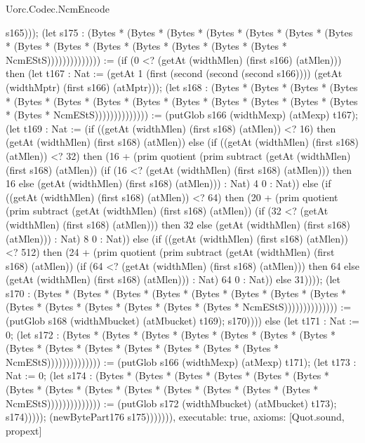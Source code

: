 \begin{lexlean}{Uorc.Codec.NcmEncode}
\begin{semanticmodule}
{s165))); (let s175 : (Bytes * (Bytes * (Bytes * (Bytes * (Bytes * (Bytes * (Bytes * (Bytes * (Bytes * (Bytes * (Bytes * (Bytes * (Bytes * (Bytes * NcmEStS)))))))))))))) := (if (0 <? (getAt (widthMlen) (first s166) (atMlen))) then (let t167 : Nat := (getAt 1 (first (second (second (second s166)))) (getAt (widthMptr) (first s166) (atMptr))); (let s168 : (Bytes * (Bytes * (Bytes * (Bytes * (Bytes * (Bytes * (Bytes * (Bytes * (Bytes * (Bytes * (Bytes * (Bytes * (Bytes * (Bytes * NcmEStS)))))))))))))) := (putGlob s166 (widthMexp) (atMexp) t167); (let t169 : Nat := (if ((getAt (widthMlen) (first s168) (atMlen)) <? 16) then (getAt (widthMlen) (first s168) (atMlen)) else (if ((getAt (widthMlen) (first s168) (atMlen)) <? 32) then (16 + (prim quotient (prim subtract (getAt (widthMlen) (first s168) (atMlen)) (if (16 <? (getAt (widthMlen) (first s168) (atMlen))) then 16 else (getAt (widthMlen) (first s168) (atMlen))) : Nat) 4 0 : Nat)) else (if ((getAt (widthMlen) (first s168) (atMlen)) <? 64) then (20 + (prim quotient (prim subtract (getAt (widthMlen) (first s168) (atMlen)) (if (32 <? (getAt (widthMlen) (first s168) (atMlen))) then 32 else (getAt (widthMlen) (first s168) (atMlen))) : Nat) 8 0 : Nat)) else (if ((getAt (widthMlen) (first s168) (atMlen)) <? 512) then (24 + (prim quotient (prim subtract (getAt (widthMlen) (first s168) (atMlen)) (if (64 <? (getAt (widthMlen) (first s168) (atMlen))) then 64 else (getAt (widthMlen) (first s168) (atMlen))) : Nat) 64 0 : Nat)) else 31)))); (let s170 : (Bytes * (Bytes * (Bytes * (Bytes * (Bytes * (Bytes * (Bytes * (Bytes * (Bytes * (Bytes * (Bytes * (Bytes * (Bytes * (Bytes * NcmEStS)))))))))))))) := (putGlob s168 (widthMbucket) (atMbucket) t169); s170)))) else (let t171 : Nat := 0; (let s172 : (Bytes * (Bytes * (Bytes * (Bytes * (Bytes * (Bytes * (Bytes * (Bytes * (Bytes * (Bytes * (Bytes * (Bytes * (Bytes * (Bytes * NcmEStS)))))))))))))) := (putGlob s166 (widthMexp) (atMexp) t171); (let t173 : Nat := 0; (let s174 : (Bytes * (Bytes * (Bytes * (Bytes * (Bytes * (Bytes * (Bytes * (Bytes * (Bytes * (Bytes * (Bytes * (Bytes * (Bytes * (Bytes * NcmEStS)))))))))))))) := (putGlob s172 (widthMbucket) (atMbucket) t173); s174))))); (newBytePart176 s175))))))),
  executable: true,
  axioms: [Quot.sound, propext]
}


\end{semanticmodule}
\end{lexlean}

